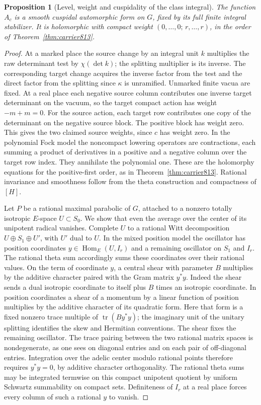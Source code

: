 \documentclass[a4paper,11pt]{article}
\newtheorem{proposition}{Proposition}[section]
\theoremstyle{definition}
\theoremstyle{remark}
\numberwithin{equation}{section}
\begin{document}
\begin{proposition}[Level, weight and cuspidality of the class integral]
\leavevmode\label{prop:secondcusp829}
The function \(A_c\) is a smooth cuspidal automorphic form
on \(G\), fixed by its full finite integral stabilizer. It
is holomorphic with compact weight
\((0,\ldots,0;\,r,\ldots,r)\), in the order of
Theorem~\ref{thm:carrier813}.
\end{proposition}
\begin{proof}
At a marked place the source change by an integral unit \(k\)
multiplies the raw determinant test by \(\chi(\det k)\);
the splitting multiplier is its inverse. The corresponding
target change acquires the inverse factor from the test and
the direct factor from the splitting since \(\kappa\) is
unramified. Unmarked finite vacua are fixed. At a real place
each negative source column contributes one inverse target
determinant on the vacuum, so the target compact action
has weight \(-m+m=0\). For the source action, each target row
contributes one copy of the determinant on the negative
source block. The positive block has weight zero. This gives
the two claimed source weights, since \(c\) has weight zero.
In the polynomial Fock model the noncompact lowering
operators are contractions, each summing a product of
derivatives in a positive and a negative column over the
target row index. They annihilate the polynomial one.
These are the holomorphy equations for the positive-first
order, as in Theorem~\ref{thm:carrier813}. Rational
invariance and smoothness follow from the theta construction
and compactness of \([H]\).

Let \(P\) be a rational maximal parabolic of \(G\), attached
to a nonzero totally isotropic \(E\)-space \(U\subset S_0\).
We show that even the average over the center of its
unipotent radical vanishes. Complete \(U\) to a rational
Witt decomposition \(U\oplus S_1\oplus U'\), with \(U'\)
dual to \(U\). In the mixed position model the oscillator has
position coordinates \(y\in\operatorname{Hom}_E(U,I_r)\)
and a remaining oscillator on \(S_1\) and \(I_r\).
The rational theta sum accordingly sums these coordinates
over their rational values. On the term of coordinate \(y\),
a central shear with parameter \(B\) multiplies by the
additive character paired with the Gram matrix \(y^*y\).
Indeed the shear sends a dual isotropic coordinate to itself
plus \(B\) times an isotropic coordinate. In position
coordinates a shear of a momentum by a linear function of
position multiplies by the additive character of its
quadratic form. Here that form is a fixed nonzero trace
multiple of \(\operatorname{tr}(B y^*y)\); the imaginary
unit of the unitary splitting identifies the skew and
Hermitian conventions. The shear fixes the remaining
oscillator. The trace pairing between the two rational
matrix spaces is nondegenerate, as one sees on diagonal
entries and on each pair of off-diagonal entries. Integration
over the adelic center modulo rational points therefore
requires \(y^*y=0\), by additive character orthogonality.
The rational theta sums may be integrated termwise on this
compact unipotent quotient by uniform Schwartz summability
on compact sets. Definiteness of \(I_r\) at a real place
forces every column of such a rational \(y\) to vanish.


\end{proof}
\end{document}
